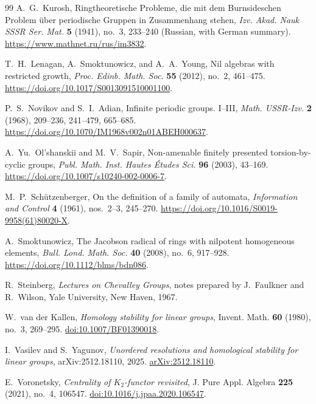 \begin{thebibliography}{99}
A.~G.~Kurosh,
Ringtheoretische Probleme, die mit dem Burnsideschen Problem
\"uber periodische Gruppen in Zusammenhang stehen,
\emph{Izv. Akad. Nauk SSSR Ser. Mat.} \textbf{5} (1941), no.~3,
233--240 (Russian, with German summary).
\url{https://www.mathnet.ru/rus/im3832}.

T.~H.~Lenagan, A.~Smoktunowicz, and A.~A.~Young,
Nil algebras with restricted growth,
\emph{Proc. Edinb. Math. Soc.} \textbf{55} (2012), no.~2, 461--475.
\url{https://doi.org/10.1017/S0013091510001100}.

P.~S.~Novikov and S.~I.~Adian,
Infinite periodic groups. I--III,
\emph{Math. USSR-Izv.} \textbf{2} (1968),
209--236, 241--479, 665--685.
\url{https://doi.org/10.1070/IM1968v002n01ABEH000637}.

A.~Yu.~Ol'shanskii and M.~V.~Sapir,
Non-amenable finitely presented torsion-by-cyclic groups,
\emph{Publ. Math. Inst. Hautes \'{E}tudes Sci.} \textbf{96} (2003),
43--169.
\url{https://doi.org/10.1007/s10240-002-0006-7}.

M.~P.~Sch\"utzenberger,
On the definition of a family of automata,
\emph{Information and Control} \textbf{4} (1961), nos.~2--3, 245--270.
\url{https://doi.org/10.1016/S0019-9958(61)80020-X}.

A.~Smoktunowicz,
The Jacobson radical of rings with nilpotent homogeneous elements,
\emph{Bull. Lond. Math. Soc.} \textbf{40} (2008), no.~6, 917--928.
\url{https://doi.org/10.1112/blms/bdn086}.

R.~Steinberg,
\emph{Lectures on Chevalley Groups},
notes prepared by J.~Faulkner and R.~Wilson,
Yale University, New Haven, 1967.

W.~van der Kallen,
\emph{Homology stability for linear groups},
Invent. Math. \textbf{60} (1980), no.~3, 269--295.
\href{https://doi.org/10.1007/BF01390018}{doi:10.1007/BF01390018}.

I.~Vasilev and S.~Yagunov,
\emph{Unordered resolutions and homological stability for linear groups},
arXiv:2512.18110, 2025.
\href{https://arxiv.org/abs/2512.18110}{arXiv:2512.18110}.

E.~Voronetsky,
\emph{Centrality of $K_2$-functor revisited},
J. Pure Appl. Algebra \textbf{225} (2021), no.~4, 106547.
\href{https://doi.org/10.1016/j.jpaa.2020.106547}{doi:10.1016/j.jpaa.2020.106547}.


\end{thebibliography}
